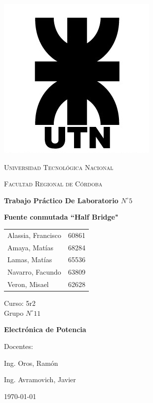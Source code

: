 \documentclass[11pt, a4paper]{article}
\begin{document}
\begin{titlepage}
 \centering
	\includegraphics[scale=0.80]{Imagenes/LOGO.jpg} \par
 	\vspace{1cm}
 	{\scshape\LARGE Universidad Tecnológica Nacional \par}
 	{\scshape\large Facultad Regional de Córdoba \par}
 	\vspace{1cm}
	{\bfseries \Large Trabajo Práctico De Laboratorio $N^{\circ} 5$\par}
	{\bfseries \Large Fuente conmutada ``Half Bridge" \par}
 	\vspace{1.5cm}

	\begin{tabular}{ll}
		Alassia, Francisco		&	60861	\\
		Amaya, Matías					&	68284	\\
		Lamas, Matías					&	65536 	\\
		Navarro, Facundo			&	63809 	\\
		Veron, Misael					&	62628
	\end{tabular}
	
	\vspace{1cm}
	Curso: 5r2 \\
	Grupo $N^{\circ} 11$
 	\vfill
	{\bfseries \Large Electrónica de Potencia \par}

	\vspace{1.5cm}
	Docentes: \par
	Ing. Oros, Ramón \par
	Ing. Avramovich, Javier \par

 	\vfill
	{\large \today\par}
\end{titlepage}
	
\end{document}
